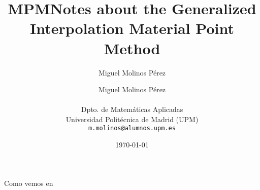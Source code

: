 \documentclass[10pt,a4paper]{article}
\author{Miguel Molinos Pérez}
\title{MPM}
\begin{document}
\title{Notes about the Generalized Interpolation Material Point
  Method} \author{
  Miguel Molinos P\'erez\\ \\
  \small{Dpto. de Matem\'aticas Aplicadas}\\
  \small{Universidad Polit\'ecnica de Madrid (UPM)}\\
  \small{\texttt{m.molinos@alumnos.upm.es}} } \date{\small{\today}}


\maketitle %
\newpage
\tableofcontents















Como vemos en \cite{Tran2019d}






\end{document}
